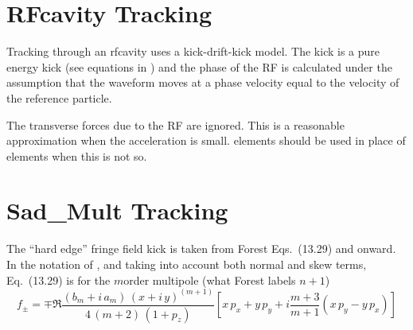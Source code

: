 \section{RFcavity Tracking}
\label{s:rfcavity.std}

Tracking through an rfcavity uses a kick-drift-kick model. The kick is
a pure energy kick (see equations in ) and the phase of
the RF is calculated under the assumption that the waveform moves at a
phase velocity equal to the velocity of the reference particle.

The transverse forces due to the RF are ignored. This is a reasonable
approximation when the acceleration is small.  elements
should be used in place of  elements when this is not so.

\section{Sad\_Mult Tracking}
\label{s:sad.mult.std}

The ``hard edge'' fringe field kick is taken from Forest\cite{b:forest} Eqs.~(13.29) and onward.
In the notation of \bmad, and taking into account both normal and skew terms, Eq.~(13.29)
is for the $m$\th order multipole (what Forest labels $n+1$)
\begin{equation}
  f_\pm = \mp \Re \frac{(b_m + i \, a_m) \, (x + i \, y)^{(m+1)}}{4 \, (m+2) \, (1 + p_z)}
    \left[ x \, p_x + y \, p_y + i\frac{m+3}{m+1}(x \, p_y - y \, p_x) \right]
\end{equation}


